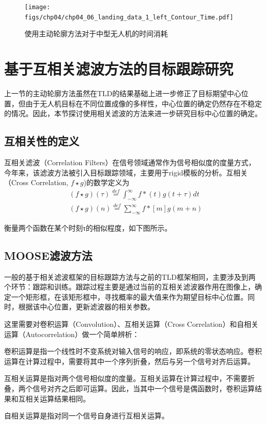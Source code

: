 \begin{figure}[ht]   
	\centering
	\texttt{[image: figs/chp04/chp04\_06\_landing\_data\_1\_left\_Contour\_Time.pdf]}
	\caption{使用主动轮廓方法对于中型无人机的时间消耗}
	\label{fig:chp04_06_landing_data_1_left_Contour_Time}
\end{figure}


\section{基于互相关滤波方法的目标跟踪研究}
上一节的主动轮廓方法虽然在TLD的结果基础上进一步修正了目标期望中心位置，但由于无人机目标在不同位置成像的多样性，中心位置的确定仍然存在不稳定的情况。因此，本节探讨使用相关滤波的方法来进一步研究目标中心位置的确定。


\subsection{互相关性的定义}
互相关滤波（Correlation Filters）在信号领域通常作为信号相似度的度量方式，今年来，该滤波方法被引入目标跟踪领域，主要用于rigid模板的分析。互相关（Cross Correlation, $f \star g$)的数学定义为
\begin{align}
&(f \star g)(\tau )\mathop  = \limits^{def} \int_{ - \infty }^\infty  {f*(t)g(t + \tau )dt} \\ 
&(f \star g)(n)\mathop  = \limits^{def} \sum\limits_{ - \infty }^\infty  {f*[m]g(m + n)}
\end{align}

衡量两个函数在某个时刻τ的相似程度，如下图所示。

\subsection{MOOSE滤波方法}
一般的基于相关滤波框架的目标跟踪方法与之前的TLD框架相同，主要涉及到两个环节：跟踪和训练。跟踪过程主要是通过当前的互相关滤波器作用在图像上，确定一个矩形框，在该矩形框中，寻找概率的最大值来作为期望目标中心位置。同时，根据该中心位置，更新滤波器的相关参数。

这里需要对卷积运算（Convolution）、互相关运算（Cross Correlation）和自相关运算（Autocorrelation）做一个简单辨析：
\begin{compactenum}
	\item 卷积运算是指一个线性时不变系统对输入信号的响应，即系统的零状态响应。卷积运算在计算过程中，需要将其中一个序列折叠，然后与另一个信号对齐后运算。
	\item 互相关运算是指对两个信号相似度的度量。互相关运算在计算过程中，不需要折叠，两个信号对齐之后即可运算。因此，当其中一个信号是偶函数时，卷积运算结果和互相关运算结果相同。
	\item 自相关运算是指对同一个信号自身进行互相关运算。
\end{compactenum}

